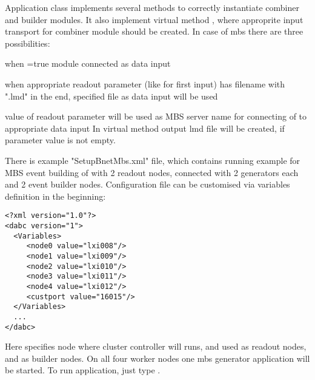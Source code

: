 Application class  implements several methods to
correctly instantiate combiner and builder modules.
It also implement virtual method , where approprite input transport 
for combiner module should be created. In case of mbs there are three possibilities:
\bnum
\item when =true module  connected as data input 
\item when appropriate readout parameter (like  for first input) has filename with 
      ".lmd" in the end, specified file as data input will be used
\item value of readout parameter  will be used as MBS server name for
      connecting of  to appropriate data input         
\enum
In virtual method  output lmd file will be created, if 
parameter  value is not empty.

There is example "SetupBnetMbs.xml" file, which contains running example for 
MBS event building of with 2 readout nodes, connected with 2 generators each and 
2 event builder nodes. Configuration file can be customised via variables definition in the beginning:
\begin{small}
\begin{verbatim}
<?xml version="1.0"?>
<dabc version="1">
  <Variables>
     <node0 value="lxi008"/>
     <node1 value="lxi009"/>
     <node2 value="lxi010"/>
     <node3 value="lxi011"/>
     <node4 value="lxi012"/>
     <custport value="16015"/>
  </Variables>
  ...
</dabc>
\end{verbatim}
\end{small}

Here  specifies node where cluster controller will runs,  and  used as readout nodes,
 and  as builder nodes. On all four worker nodes one mbs generator
application will be started. To run application, just type .  
